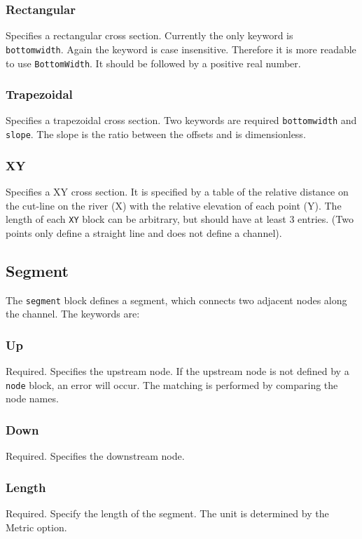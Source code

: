 \documentclass[10pt, letterpaper]{article}
\begin{document}
\subsubsection{Rectangular}
\label{subsubsec:rect}
Specifies a rectangular cross section. Currently the only keyword is {\tt
  bottomwidth}. Again the keyword is case insensitive. Therefore it is more readable to
use {\tt BottomWidth}. It should be followed by a positive real number. 

\subsubsection{Trapezoidal}
\label{subsubsec:trap}
Specifies a trapezoidal cross section. Two keywords are required {\tt bottomwidth} and
{\tt slope}. The slope is the ratio between the offsets and is dimensionless.

\subsubsection{XY}
\label{subsubsec:xy}
Specifies a XY cross section. It is specified by a table of the relative distance on the
cut-line on the river (X) with the relative elevation of each point (Y). The length of
each {\tt XY} block can be arbitrary, but should have at least 3 entries. (Two points
only define a straight line and does not define a channel).

\subsection{Segment}
\label{subsec:segment}
The {\tt segment} block defines a segment, which connects two adjacent nodes along the channel. The 
keywords are:

\subsubsection{Up}
\label{subsubsec:up}
Required. Specifies the upstream node. If the upstream node is not defined by a
{\tt node} block, an error will occur. The matching is performed by comparing the node
names.

\subsubsection{Down}
\label{subsubsec:down}
Required. Specifies the downstream node. 

\subsubsection{Length}
\label{subsubsec:length}
Required. Specify the length of the segment. The unit is determined by the Metric option.
\end{document}
